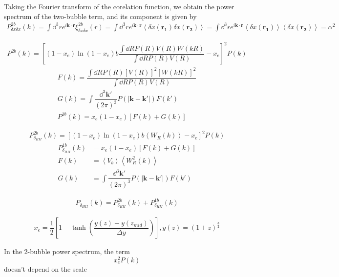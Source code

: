 Taking the Fourier transform of the corelation function, we obtain the power spectrum of the two-bubble term, and its component is given by
\begin{align*}
  P^{2b}_{\delta x\delta x}(k)
  = \int \dd^3{r} e^{i \mathbf{k}\cdot \mathbf{r}}\xi^{2b}_{\delta x\delta x}(r)
  = \int \dd^3{r} e^{i \mathbf{k}\cdot \mathbf{r}}
    \left<\delta x(\mathbf{r_1})\delta x(\mathbf{r_2})\right>
  = \int \dd^3{r} e^{i \mathbf{k}\cdot \mathbf{r}}
    \left<\delta x(\mathbf{r_1})\right>
    \left<\delta x(\mathbf{r_2})\right>
  = \alpha^2 
\end{align*}


\begin{align*}
  P^{2b}(k) = \left[(1-x_e)\ln(1-x_e)b\dfrac{\int\dd{R}P(R)V(R)W(kR)}{\int\dd{R}P(R)V(R)}-x_e\right]^2P(k)
\end{align*}
\begin{align*}
  F(k) = \dfrac{\int\dd{R}P(R)[V(R)]^2[W(kR)]^2}{\int\dd{R}P(R)V(R)}\\
  G(k) = \int\dfrac{\dd^3\mathbf{k}'}{(2\pi)^3}P(\left|\mathbf{k}-\mathbf{k}'\right|)F(k')\\
  P^{1b}(k) = x_e(1-x_e)[F(k)+G(k)]
\end{align*}


\begin{align*}
    P^{2b}_{\delta_{HII}}(k) = \left[(1-x_e)\ln(1-x_e)b\left<W_R(k)\right>-x_e\right]^2P(k)
\end{align*}
\begin{align*}
  P^{1b}_{\delta_{HII}}(k) &= x_e(1-x_e)[F(k)+G(k)]\\
  F(k) &= \left<V_b\right>\left<W_R^2(k)\right>\\
  G(k) &= \int\dfrac{\dd^3\mathbf{k}'}{(2\pi)^3}P(\left|\mathbf{k}-\mathbf{k}'\right|)F(k')
\end{align*}

\begin{align*}
  P_{\delta_{HII}}(k) = P^{2b}_{\delta_{HII}}(k)+P^{1b}_{\delta_{HII}}(k) 
\end{align*}

\begin{align*}
  x_e = \dfrac{1}{2}\left[1-\tanh\left(\dfrac{y(z)-y(z_{mid})}{\Delta y}\right)\right], y(z) = \left(1+z\right)^{\frac{3}{2}}
\end{align*}

In the 2-bubble power spectrum, the term 
\[
x_e^2 P(k)
\]
doesn't depend on the scale 



